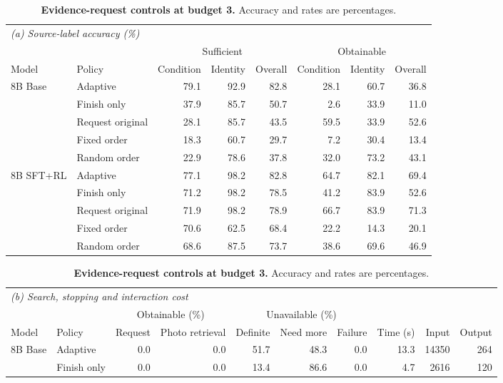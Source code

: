 \begin{table}[t]\centering\small\setlength{\tabcolsep}{4pt}
\begin{minipage}{.94\textwidth}\centering
\caption{\textbf{Evidence-request controls at budget 3.}
Accuracy and rates are percentages.}
\label{tab:evidence-controls}
\begin{tabular}{@{}llrrrrrr@{}}\toprule
\multicolumn{8}{l}{\emph{(a) Source-label accuracy (\%)}}\\
& & \multicolumn{3}{c}{Sufficient} & \multicolumn{3}{c}{Obtainable}\\
\cmidrule(lr){3-5}\cmidrule(l){6-8}
Model & Policy & Condition & Identity & Overall & Condition & Identity & Overall\\\midrule
8B Base & Adaptive & 79.1 & 92.9 & 82.8 & 28.1 & 60.7 & 36.8\\
 & Finish only & 37.9 & 85.7 & 50.7 & 2.6 & 33.9 & 11.0\\
 & Request original & 28.1 & 85.7 & 43.5 & 59.5 & 33.9 & 52.6\\
 & Fixed order & 18.3 & 60.7 & 29.7 & 7.2 & 30.4 & 13.4\\
 & Random order & 22.9 & 78.6 & 37.8 & 32.0 & 73.2 & 43.1\\
\midrule
8B SFT+RL & Adaptive & 77.1 & 98.2 & 82.8 & 64.7 & 82.1 & 69.4\\
 & Finish only & 71.2 & 98.2 & 78.5 & 41.2 & 83.9 & 52.6\\
 & Request original & 71.9 & 98.2 & 78.9 & 66.7 & 83.9 & 71.3\\
 & Fixed order & 70.6 & 62.5 & 68.4 & 22.2 & 14.3 & 20.1\\
 & Random order & 68.6 & 87.5 & 73.7 & 38.6 & 69.6 & 46.9\\
\bottomrule
\end{tabular}\par\vspace{6pt}
\begin{tabular}{@{}llrrrrrrrr@{}}\toprule
\multicolumn{10}{l}{\emph{(b) Search, stopping and interaction cost}}\\
& & \multicolumn{2}{c}{Obtainable (\%)} & \multicolumn{3}{c}{Unavailable (\%)} & & &\\
\cmidrule(lr){3-4}\cmidrule(lr){5-7}
Model & Policy & Request & Photo retrieval & Definite & Need more & Failure & Time (s) & Input & Output\\\midrule
8B Base & Adaptive & 0.0 & 0.0 & 51.7 & 48.3 & 0.0 & 13.3 & 14350 & 264\\
 & Finish only & 0.0 & 0.0 & 13.4 & 86.6 & 0.0 & 4.7 & 2616 & 120\\

\end{tabular}
\end{minipage}
\end{table}
